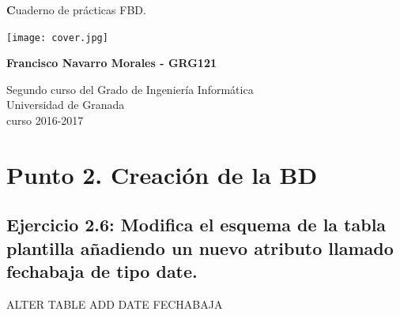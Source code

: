 \documentclass[a4paper, 11pt]{article}
\begin{document}
	
	
	\begin{titlepage}
		\begin{center}
			\vspace*{2cm}
			
			{\Huge \textbf Cuaderno de prácticas FBD.}
			
			
			\vspace{0.5cm}
			
			
		    \centering \texttt{[image: cover.jpg]}
		    
			
			\vspace{2cm}
			
			\textbf{Francisco Navarro Morales - GRG121 }
			
			\vfill
			
			Segundo curso del Grado de Ingeniería Informática\\
			Universidad de Granada\\
			curso 2016-2017\\
			
		\end{center}
	\end{titlepage}



\renewcommand{\abstractname}{Resumen} %



{\parskip=2pt
  \tableofcontents
}


\pagebreak

\section{Punto 2. Creación de la BD}
\subsection{ Ejercicio 2.6: Modifica el esquema de la tabla plantilla añadiendo un nuevo atributo llamado fechabaja de tipo date.}	
ALTER TABLE ADD DATE FECHABAJA
\end{document}
